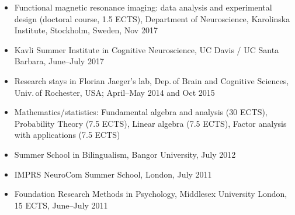 \documentclass[margin, 11pt]{res} %
\begin{document}
\begin{resume}
\begin{itemize}
\item Functional magnetic resonance imaging: data analysis and experimental design (doctoral course, 1.5 ECTS), Department of Neuroscience, Karolinska Institute, Stockholm, Sweden, Nov 2017

\item Kavli Summer Institute in Cognitive Neuroscience, UC Davis / UC Santa Barbara, June--July 2017

\item Research stays in Florian Jaeger's lab, Dep.\,of Brain and Cognitive Sciences, Univ.\,of Rochester, USA; April--May 2014 and Oct 2015

\item Mathematics/statistics: 
Fundamental algebra and analysis (30 ECTS), Probability Theory (7.5 ECTS), Linear algebra (7.5 ECTS), Factor analysis with applications (7.5 ECTS)

\item Summer School in Bilingualism, Bangor University, July 2012
 
\item IMPRS NeuroCom Summer School, London, July 2011 

\item Foundation Research Methods in Psychology, Middlesex University London, 15 ECTS, June--July 2011

\end{itemize}










\end{resume}
\end{document}
